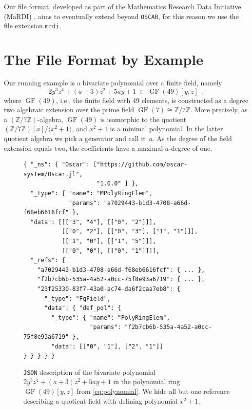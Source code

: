\documentclass[runningheads]{llncs}
\newcommand\OSCAR{\texttt{OSCAR}\xspace}
\newcommand\JSON{\texttt{JSON}\xspace}
\newcommand\ZZ{{\mathbb Z}}
\newcommand\GF[1]{\operatorname{GF}(#1)}
\begin{document}
Our file format, developed as part of the Mathematics Research Data Initiative (MaRDI) \cite{the_mardi_consortium_2022_6552436}, aims to eventually extend beyond \OSCAR, for this reason we use the file extension \texttt{mrdi}.

\section{The File Format by Example}
\label{sec:example}

Our running example is a bivariate polynomial over a finite field, namely
\begin{equation}\label{eq:polynomial}
  2y^3z^4 + (a + 3)z^2 + 5ay + 1 \ \in \ \GF{49}[y, z] \enspace ,
\end{equation}
where $\GF{49}$, i.e., the finite field with 49 elements, is constructed as a degree two algebraic extension over the prime field $\GF{7}\cong\ZZ/7\ZZ$.
More precisely, as a $(\ZZ / {7 \ZZ})$-algebra, $\GF{49}$ is isomorphic to the quotient $(\ZZ / {7 \ZZ})[x]/ \langle x^2 + 1 \rangle$, and $x^2 + 1$ is a minimal polynomial.
In the latter quotient algebra we pick a generator and call it~$a$.
As the degree of the field extension equals two, the coefficients have a maximal $a$-degree of one.
\begin{figure}[bh]
   \begin{verbatim}
{ "_ns": { "Oscar": ["https://github.com/oscar-system/Oscar.jl",
                     "1.0.0" ] },
  "_type": { "name": "MPolyRingElem",
             "params": "a7029443-b1d3-4708-a66d-f68eb6616fcf" },
  "data": [[["3", "4"], [["0", "2"]]],
           [["0", "2"], [["0", "3"], ["1", "1"]]],
           [["1", "0"], [["1", "5"]]],
           [["0", "0"], [["0", "1"]]]],
  "_refs": {
    "a7029443-b1d3-4708-a66d-f68eb6616fcf": { ... },
    "f2b7cb6b-535a-4a52-a0cc-75f8e93a6719": { ... },
    "23f25330-83f7-43a0-ac74-da6f2caa7eb8": {
      "_type": "FqField",
      "data": { "def_pol": {
        "_type": { "name": "PolyRingElem", 
                   "params": "f2b7cb6b-535a-4a52-a0cc-75f8e93a6719" },
        "data": [["0", "1"], ["2", "1"]]
} } } } }
\end{verbatim}
\caption{%
  \JSON description of the bivariate polynomial $2y^3z^4 + (a + 3)z^2 + 5ay + 1$ in the polynomial ring $\GF{49}[y, z]$ from \eqref{eq:polynomial}.
  We hide all but one reference describing a quotient field with defining polynomial $x^2+ 1$.
  \label{fig:json-polynomial}
}
\end{figure}
\end{document}
